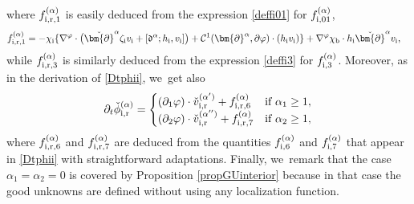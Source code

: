 \documentclass[JEP,XML,SOM,Unicode,NoFloatCountersInSection,published]{cedram}
\newcommand{\dt}{\partial_t}
\theoremstyle{definition}
\begin{document}
where $f_{{\rm i},{\rm r},1}^{(\alpha)}$ is easily deduced from the expression \eqref{deffi01} for $f_{{\rm i},01}^{(\alpha)}$,
\begin{align*}
f_{{\rm i},{\rm r},1}^{(\alpha)}
&= -\chi_\mathrm{i}\{ \nabla^\varphi\cdot\bigl(\check{\bm{\partial}}^\alpha\zeta_\mathrm{i} v_\mathrm{i}
+ [\mathfrak{d}^\alpha;h_\mathrm{i},v_\mathrm{i}] \bigr)
+ {\mathcal C}^1(\bm{\partial}^\alpha,\partial\varphi)\cdot(h_\mathrm{i}v_\mathrm{i}) \}
+ \nabla^\varphi\chi_\mathrm{b}\cdot h_\mathrm{i} \check{\bm{\partial}}^\alpha v_\mathrm{i} ,
\end{align*}
while $f_{{\rm i},{\rm r},3}^{(\alpha)}$ is similarly deduced from the expression \eqref{deffi3} for $f_{{\rm i},3}^{(\alpha)}$.
Moreover, as in the derivation of \eqref{Dtphii}, we~get also
\begin{equation}\label{Dtphiir}
\dt\check{\phi}_\mathrm{i,r}^{(\alpha)} =
\begin{cases}
(\partial_1\varphi)\cdot\check{v}_\mathrm{i,r}^{(\alpha')} + f_{{\rm i,r},6}^{(\alpha)} &\mbox{if } \alpha_1\geq1, \\
(\partial_2\varphi)\cdot\check{v}_\mathrm{i,r}^{(\alpha'')} + f_{{\rm i,r},7}^{(\alpha)} &\mbox{if } \alpha_2\geq1,
\end{cases}
\end{equation}
where $f_{{\rm i,r},6}^{(\alpha)}$ and $f_{{\rm i,r},7}^{(\alpha)}$ are deduced from the quantities $f_{{\rm i},6}^{(\alpha)}$ and
$f_{{\rm i},7}^{(\alpha)}$ that appear in \eqref{Dtphii} with straightforward adaptations.
Finally, we~remark that the case $\alpha_1=\alpha_2=0$ is covered by Proposition \ref{propGUinterior}
because in that case the good unknowns are defined without using any localization function.
\end{document}

